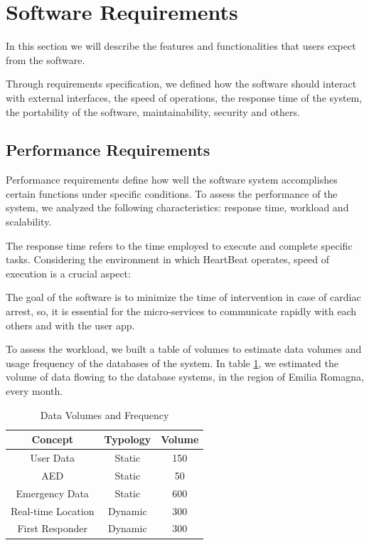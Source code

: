 \documentclass[11pt,a4paper]{article}
\begin{document}
\section{Software Requirements}
In this section we will describe the features and functionalities that users expect from the software.

Through requirements specification, we defined how the software should interact with external interfaces, the speed of operations, the response time of the system, the portability of the software, maintainability, security and others.

\subsection{Performance Requirements}
Performance requirements define how well the software system accomplishes certain functions under specific conditions.
%
To assess the performance of the system, we analyzed the following characteristics: response time, workload and scalability.

The response time refers to the time employed to execute and complete specific tasks. 
%
Considering the environment in which HeartBeat operates, speed of execution is a crucial aspect:

The goal of the software is to minimize the time of intervention in case of cardiac arrest, so, it is essential for the micro-services to communicate rapidly with each others and with the user app.

To assess the workload, we built a table of volumes to estimate data volumes and usage frequency of the databases of the system.
%
In table \ref{table:volume}, we estimated the volume of data flowing to the database systems, in the region of Emilia Romagna, every month.

\begin{table}
\centering
\begin{tabular}{|c c c|} 
 \hline
 Concept & Typology & Volume \\ [0.5ex] 
 \hline\hline
 User Data & Static & 150 \\ 
 AED & Static & 50 \\
 Emergency Data & Static & 600 \\
 Real-time Location & Dynamic & 300 \\
 First Responder & Dynamic & 300 \\ [1ex] 
 \hline
\end{tabular}
\caption{Data Volumes and Frequency}
\label{table:volume}
\end{table}
\end{document}
